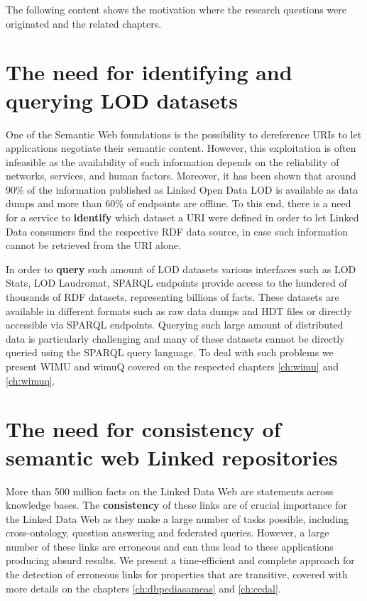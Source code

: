 The following content shows the motivation where the research questions were originated and the related chapters.

\section{The need for identifying and querying LOD datasets}
One of the Semantic Web foundations is the possibility to dereference URIs to let applications negotiate their semantic content.
However, this exploitation is often infeasible as the availability of such information depends on the reliability of networks, services, and human factors.
Moreover, it has been shown that around 90\% of the information published as Linked Open Data \ac{LOD} is available as data dumps and more than 60\% of endpoints are offline.
To this end, there is a need for a service to \textbf{identify} which dataset a URI were defined in order to let Linked Data consumers find the respective RDF data source, in case such information cannot be retrieved from the URI alone.

In order to \textbf{query} such amount of LOD datasets various interfaces such as LOD Stats\cite{auer2012lodstats}, LOD Laudromat\cite{beek2014lod}, SPARQL endpoints provide access to the hundered of thousands of RDF datasets, representing billions of facts. These datasets are available in different formats such as raw data dumps and HDT files or directly accessible via SPARQL endpoints. Querying such large amount of distributed data is particularly challenging and many of these datasets cannot be directly queried using the SPARQL query language. To deal with such problems we present WIMU\cite{valdestilhas2018my} and wimuQ\cite{ValdestilhasKcap} covered on the respected chapters \ref{ch:wimu} and \ref{ch:wimuq}.

\section{The need for consistency of semantic web Linked repositories}
More than 500 million facts on the Linked Data Web are statements across knowledge bases. The \textbf{consistency} of these links are of crucial importance for the Linked Data Web as they make a large number of tasks possible, including  cross-ontology, question answering and federated queries. However, a large number of these links are erroneous and can thus lead to these applications producing absurd results. We present a time-efficient and complete approach for the detection of erroneous links for properties that are transitive\cite{valdestilhasdbpediasameas, valdestilhas2017cedal}, covered with more details on the chapters \ref{ch:dbpediasameas} and \ref{ch:cedal}.

